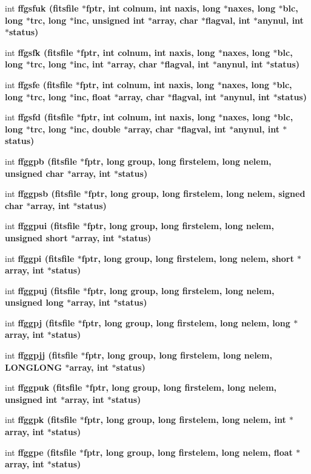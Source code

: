 \begin{CompactItemize}
int \bf{ffgsfuk} (\bf{fitsfile} $\ast$fptr, int colnum, int naxis, long $\ast$naxes, long $\ast$blc, long $\ast$trc, long $\ast$inc, unsigned int $\ast$array, char $\ast$flagval, int $\ast$anynul, int $\ast$status)
\item 
int \bf{ffgsfk} (\bf{fitsfile} $\ast$fptr, int colnum, int naxis, long $\ast$naxes, long $\ast$blc, long $\ast$trc, long $\ast$inc, int $\ast$array, char $\ast$flagval, int $\ast$anynul, int $\ast$status)
\item 
int \bf{ffgsfe} (\bf{fitsfile} $\ast$fptr, int colnum, int naxis, long $\ast$naxes, long $\ast$blc, long $\ast$trc, long $\ast$inc, float $\ast$array, char $\ast$flagval, int $\ast$anynul, int $\ast$status)
\item 
int \bf{ffgsfd} (\bf{fitsfile} $\ast$fptr, int colnum, int naxis, long $\ast$naxes, long $\ast$blc, long $\ast$trc, long $\ast$inc, double $\ast$array, char $\ast$flagval, int $\ast$anynul, int $\ast$status)
\item 
int \bf{ffggpb} (\bf{fitsfile} $\ast$fptr, long group, long firstelem, long nelem, unsigned char $\ast$array, int $\ast$status)
\item 
int \bf{ffggpsb} (\bf{fitsfile} $\ast$fptr, long group, long firstelem, long nelem, signed char $\ast$array, int $\ast$status)
\item 
int \bf{ffggpui} (\bf{fitsfile} $\ast$fptr, long group, long firstelem, long nelem, unsigned short $\ast$array, int $\ast$status)
\item 
int \bf{ffggpi} (\bf{fitsfile} $\ast$fptr, long group, long firstelem, long nelem, short $\ast$array, int $\ast$status)
\item 
int \bf{ffggpuj} (\bf{fitsfile} $\ast$fptr, long group, long firstelem, long nelem, unsigned long $\ast$array, int $\ast$status)
\item 
int \bf{ffggpj} (\bf{fitsfile} $\ast$fptr, long group, long firstelem, long nelem, long $\ast$array, int $\ast$status)
\item 
int \bf{ffggpjj} (\bf{fitsfile} $\ast$fptr, long group, long firstelem, long nelem, \bf{LONGLONG} $\ast$array, int $\ast$status)
\item 
int \bf{ffggpuk} (\bf{fitsfile} $\ast$fptr, long group, long firstelem, long nelem, unsigned int $\ast$array, int $\ast$status)
\item 
int \bf{ffggpk} (\bf{fitsfile} $\ast$fptr, long group, long firstelem, long nelem, int $\ast$array, int $\ast$status)
\item 
int \bf{ffggpe} (\bf{fitsfile} $\ast$fptr, long group, long firstelem, long nelem, float $\ast$array, int $\ast$status)

\end{CompactItemize}
